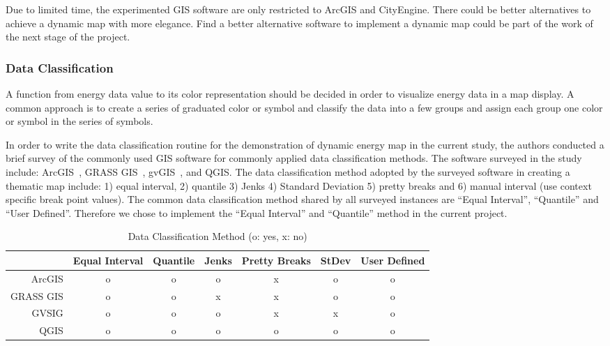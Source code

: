Due to limited time, the experimented GIS software are only restricted
to ArcGIS and CityEngine. There could be better alternatives to
achieve a dynamic map with more elegance. Find a better alternative
software to implement a dynamic map could be part of the work of the
next stage of the project.

\subsubsection{Data Classification}\label{dataClassification}
A function from energy data value to its color representation should
be decided in order to visualize energy data in a map display. A
common approach is to create a series of graduated color or symbol and
classify the data into a few groups and assign each group one color or
symbol in the series of symbols. 

In order to write the data classification routine for the
demonstration of dynamic energy map in the current study, the authors
conducted a brief survey of the commonly used GIS software for
commonly applied data classification methods. The software surveyed in
the study include: ArcGIS~\cite{GIS_Jenks2014}, GRASS
GIS~\cite{GRASSGIS2008}, gvGIS~\cite{gvGIS2011}, and QGIS. The data
classification method adopted by the surveyed software in creating a
thematic map include: 1) equal interval, 2) quantile 3) Jenks 4)
Standard Deviation 5) pretty breaks and 6) manual interval (use
context specific break point values). The common data classification
method shared by all surveyed instances are ``Equal Interval'',
``Quantile'' and ``User Defined''. Therefore we chose to implement the
``Equal Interval'' and ``Quantile'' method in the current project.

\begin{table}[h!]
  \centering
  \begin{tabular}{r|c c c c c c}
    \hline
           & Equal Interval & Quantile & Jenks & Pretty Breaks & StDev & User Defined\\
    \hline
    ArcGIS &      o        &    o     &  o    & x &  o  &   o  \\
 GRASS GIS &      o        &    o     &  x    & x &  o  &   o  \\
     GVSIG &      o        &    o     &  o    & x &  x  &   o  \\
      QGIS &      o        &    o     &  o    & o &  o  &   o  \\
    \hline
  \end{tabular}
  \caption{Data Classification Method (o: yes, x: no)}
  \label{tab:classify}
\end{table}

